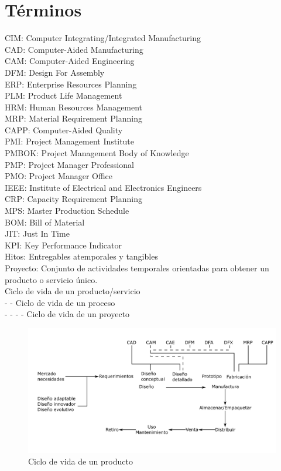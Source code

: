 \section{Términos}

CIM: Computer Integrating/Integrated Manufacturing \\
CAD: Computer-Aided Manufacturing \\
CAM: Computer-Aided Engineering \\
DFM: Design For Assembly \\
ERP: Enterprise Resources Planning \\
PLM: Product Life Management \\
HRM: Human Resources Management \\
MRP: Material Requirement Planning \\
CAPP: Computer-Aided Quality \\
PMI: Project Management Institute \\
PMBOK: Project Management Body of Knowledge \\
PMP: Project Manager Professional \\
PMO: Project Manager Office \\
IEEE: Institute of Electrical and Electronics Engineers \\
CRP: Capacity Requirement Planning \\
MPS: Master Production Schedule \\
BOM: Bill of Material \\
JIT: Just In Time \\
KPI: Key Performance Indicator \\
Hitos: Entregables atemporales y tangibles \\
Proyecto: Conjunto de actividades temporales orientadas para obtener un producto o servicio único. \\
Ciclo de vida de un producto/servicio \\
- - Ciclo de vida de un proceso \\
- - - - Ciclo de vida de un proyecto

\begin{figure}[h!]
    \centering
        \includegraphics[scale=0.15]{Manufactura Integrada por Computadora Figuras/Figura01 Ciclo de Vida de Producto.png}
        \caption{Ciclo de vida de un producto}
\end{figure}